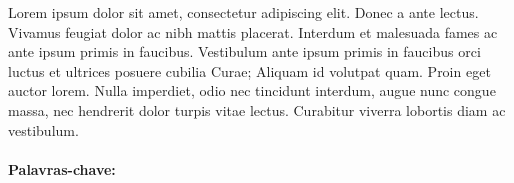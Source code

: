 \begin{singlespace}

\noindent Lorem ipsum dolor sit amet, consectetur adipiscing elit. Donec a ante lectus. Vivamus feugiat dolor ac nibh mattis placerat. Interdum et malesuada fames ac ante ipsum primis in faucibus. Vestibulum ante ipsum primis in faucibus orci luctus et ultrices posuere cubilia Curae; Aliquam id volutpat quam. Proin eget auctor lorem. Nulla imperdiet, odio nec tincidunt interdum, augue nunc congue massa, nec hendrerit dolor turpis vitae lectus. Curabitur viverra lobortis diam ac vestibulum.\\\\
\textbf{Palavras-chave:} \textsf{\ptBRKeyword}
\end{singlespace}